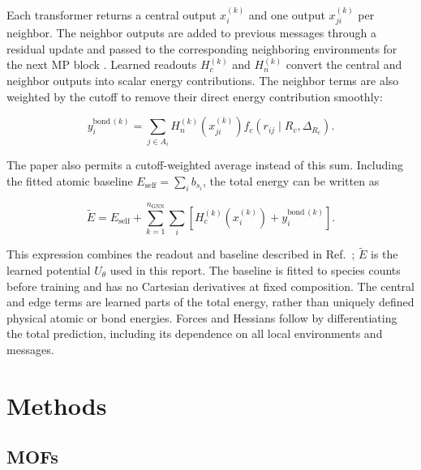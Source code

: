 \documentclass[12pt,a4paper]{article}
\numberwithin{equation}{section}
\begin{document}
Each transformer returns a central output $x_i^{(k)}$ and one output
$x_{ji}^{(k)}$ per neighbor. The neighbor outputs are added to previous
messages through a residual update and passed to the corresponding
neighboring environments for the next MP block \cite[Appendix~A]{pet}.
Learned readouts $H_c^{(k)}$ and $H_n^{(k)}$ convert the central and neighbor
outputs into scalar energy contributions. The neighbor terms are also
weighted by the cutoff to remove their direct energy contribution smoothly:

\begin{equation}
  y_i^{\mathrm{bond}\,(k)}
   =\sum_{j\in A_i}H_n^{(k)}(x_{ji}^{(k)})
                   f_c(r_{ij}\mid R_c,\Delta_{R_c}).
  \label{eq:pet-bond-sum}
\end{equation}

The paper also permits a cutoff-weighted average instead of this sum.
Including the fitted atomic baseline $E_{\mathrm{self}}=\sum_i b_{s_i}$,
the total energy can be written as

\begin{equation}
  \tilde E=E_{\mathrm{self}}
    +\sum_{k=1}^{n_{\mathrm{GNN}}}\sum_i
      \left[H_c^{(k)}(x_i^{(k)})+y_i^{\mathrm{bond}\,(k)}\right].
  \label{eq:pet-readout}
\end{equation}

This expression combines the readout and baseline described in
Ref.~\cite{pet}; $\tilde E$ is the learned potential $U_\theta$ used in
this report. The baseline is fitted to species counts before training and
has no Cartesian derivatives at fixed composition. The central and edge
terms are learned parts of the total energy, rather than uniquely defined
physical atomic or bond energies. Forces and Hessians follow by
differentiating the total prediction, including its dependence on all
local environments and messages.

\section{Methods}

\subsection{MOFs}
\label{sec:framework-method}
\end{document}
